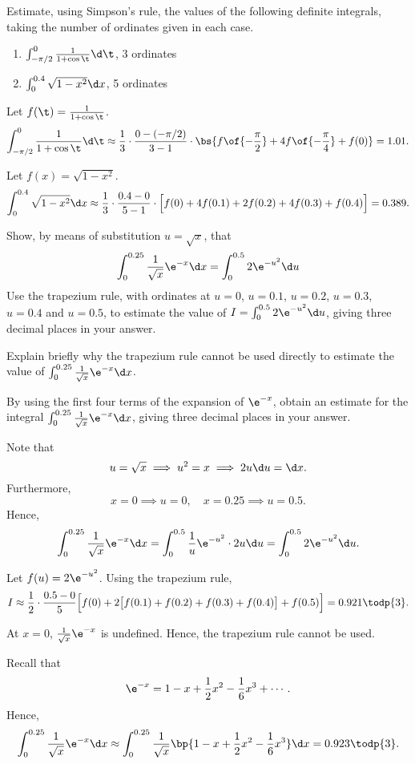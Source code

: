 \begin{problem}
    Estimate, using Simpson's rule, the values of the following definite integrals, taking the number of ordinates given in each case.

    \begin{enumerate}
        \item $\int_{-\pi/2}^0 \frac1{1 + \cos\t} \d \t$, 3 ordinates
        \item $\int_0^{0.4} \sqrt{1 - x^2} \d x$, 5 ordinates
    \end{enumerate}
\end{problem}
\begin{solution}
    \begin{ppart}
        Let $f(\t) = \frac1{1+\cos\t}$. \[\int_{-\pi/2}^0 \frac1{1 + \cos\t} \d \t \approx \frac13 \cdot \frac{0 - (-\pi/2)}{3 - 1} \cdot \bs{f\of{-\frac\pi2} + 4f\of{-\frac\pi4} + f(0)} = 1.01.\]
    \end{ppart}
    \begin{ppart}
        Let $f(x) = \sqrt{1 - x^2}$. \[\int_0^{0.4} \sqrt{1 - x^2} \d x \approx \frac13 \cdot \frac{0.4 - 0}{5 - 1} \cdot \Big[f(0) + 4f(0.1) + 2f(0.2) + 4f(0.3) + f(0.4)\Big] = 0.389.\]
    \end{ppart}
\end{solution}

\begin{problem}
    Show, by means of substitution $u = \sqrt{x}$, that
    \[
        \int_0^{0.25} \frac1{\sqrt{x}} \e^{-x} \d x = \int_0^{0.5} 2\e^{-u^2} \d u
    \]
    Use the trapezium rule, with ordinates at $u = 0$, $u = 0.1$, $u = 0.2$, $u = 0.3$, $u = 0.4$ and $u = 0.5$, to estimate the value of $I = \int_0^{0.5} 2\e^{-u^2} \d u$, giving three decimal places in your answer.

    Explain briefly why the trapezium rule cannot be used directly to estimate the value of $\int_0^{0.25} \frac1{\sqrt{x}} \e^{-x} \d x$.

    By using the first four terms of the expansion of $\e^{-x}$, obtain an estimate for the integral $\int_0^{0.25} \frac1{\sqrt{x}}\e^{-x} \d x$, giving three decimal places in your answer.
\end{problem}
\begin{solution}
    Note that \[u = \sqrt{x} \implies u^2 = x \implies 2u \d u = \d x.\] Furthermore, \[x = 0 \implies u = 0, \quad x = 0.25 \implies u = 0.5.\] Hence, \[\int_0^{0.25} \frac1{\sqrt{x}} \e^{-x} \d x = \int_{0}^{0.5} \frac1u \e^{-u^2} \cdot 2u \d u = \int_0^{0.5} 2\e^{-u^2} \d u.\]

    Let $f(u) = 2\e^{-u^2}$. Using the trapezium rule, \[I \approx \frac12 \cdot \frac{0.5 - 0}{5} \Big[f(0) + 2\big[f(0.1) + f(0.2) + f(0.3) + f(0.4)\big] + f(0.5) \Big] = 0.921 \todp{3}.\]

    At $x = 0$, $\frac1{\sqrt{x}}\e^{-x}$ is undefined. Hence, the trapezium rule cannot be used.

    Recall that \[\e^{-x} = 1 - x + \frac12 x^2 - \frac16 x^3 + \cdots.\] Hence, \[\int_0^{0.25} \frac1{\sqrt{x}} \e^{-x} \d x \approx \int_0^{0.25} \frac1{\sqrt x}\bp{1 - x + \frac12 x^2 - \frac16 x^3} \d x = 0.923 \todp{3}.\]
\end{solution}

